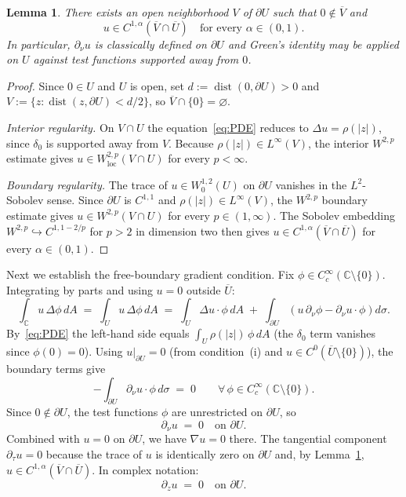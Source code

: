 \documentclass[11pt]{article}
\newtheorem{lemma}[theorem]{Lemma}
\newcommand{\C}{\mathbb{C}}
\newcommand{\1}{\mathbf{1}}
\begin{document}
\begin{lemma}\label{lem:boundary-regularity}
  There exists an open neighborhood $V$ of $\partial U$ such that $0\notin \overline V$ and
  \[
    u\in C^{1,\alpha}(\overline V\cap \overline U)\quad\text{for every }\alpha\in(0,1).
  \]
  In particular, $\partial_\nu u$ is classically defined on $\partial U$ and Green's identity
  may be applied on $U$ against test functions supported away from $0$.
\end{lemma}

\begin{proof}
  Since $0\in U$ and $U$ is open, set $d:=\operatorname{dist}(0,\partial U)>0$ and
  $V:=\{z:\operatorname{dist}(z,\partial U)<d/2\}$, so $\overline V\cap\{0\}=\varnothing$.

  \emph{Interior regularity.}  On $V\cap U$ the equation~\eqref{eq:PDE} reduces to
  $\Delta u=\rho(|z|)$, since $\delta_0$ is supported away from $V$.  Because
  $\rho(|z|)\in L^\infty(V)$, the interior $W^{2,p}$ estimate
  \cite[Theorem~9.11]{GilbargTrudinger} gives $u\in W^{2,p}_{\mathrm{loc}}(V\cap U)$ for
  every $p<\infty$.

  \emph{Boundary regularity.}  The trace of $u\in W^{1,2}_0(U)$ on $\partial U$ vanishes in
  the $L^2$-Sobolev sense.  Since $\partial U$ is $C^{1,1}$ and $\rho(|z|)\in L^\infty(V)$,
  the $W^{2,p}$ boundary estimate \cite[Theorem~9.13]{GilbargTrudinger} gives
  $u\in W^{2,p}(V\cap U)$ for every $p\in(1,\infty)$.  The Sobolev embedding
  $W^{2,p}\hookrightarrow C^{1,1-2/p}$ for $p>2$ in dimension two
  \cite[Theorem~7.26]{GilbargTrudinger} then gives $u\in C^{1,\alpha}(\overline V\cap\overline U)$
  for every $\alpha\in(0,1)$.
\end{proof}

Next we establish the free-boundary gradient condition.  Fix $\phi\in C_c^\infty(\C\setminus\{0\})$.
Integrating by parts and using $u=0$ outside $\overline U$:
\[
  \int_\C u\,\Delta\phi\,dA
  \;=\;
  \int_U u\,\Delta\phi\,dA
  \;=\;
  \int_U \Delta u\cdot\phi\,dA
  \;+\;
  \int_{\partial U}\!\left(u\,\partial_\nu\phi - \partial_\nu u\cdot\phi\right)d\sigma.
\]
By~\eqref{eq:PDE} the left-hand side equals $\int_U\rho(|z|)\,\phi\,dA$ (the $\delta_0$ term
vanishes since $\phi(0)=0$).  Using $u|_{\partial U}=0$ (from condition~(i) and
$u\in C^0(\overline U\setminus\{0\})$), the boundary terms give
\[
  -\int_{\partial U}\partial_\nu u\cdot\phi\,d\sigma \;=\; 0
  \qquad \forall\,\phi\in C_c^\infty(\C\setminus\{0\}).
\]
Since $0\notin\partial U$, the test functions $\phi$ are unrestricted on $\partial U$, so
\begin{equation}\label{eq:Neumann}
  \partial_\nu u \;=\; 0 \quad\text{on }\partial U.
\end{equation}
Combined with $u=0$ on $\partial U$, we have $\nabla u=0$ there.  The tangential component
$\partial_\tau u=0$ because the trace of $u$ is identically zero on $\partial U$ and, by
Lemma~\ref{lem:boundary-regularity}, $u\in C^{1,\alpha}(\overline V\cap\overline U)$.  In
complex notation:
\begin{equation}\label{eq:dz-zero}
  \partial_z u \;=\; 0 \quad\text{on }\partial U.
\end{equation}
\end{document}
